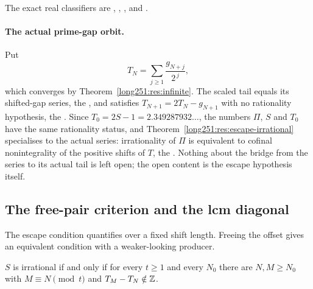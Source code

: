 \documentclass[11pt]{article}
\begin{document}
\noindent The exact real classifiers are
,
,
, and
.

\paragraph{The actual prime-gap orbit.}
Put
\[
 T_N=\sum_{j\ge1}\frac{g_{N+j}}{2^{\,j}},
\]
which converges by Theorem~\ref{long251:res:infinite}.  The scaled tail equals its
shifted-gap series, the
, and satisfies $T_{N+1}=2T_N-g_{N+1}$ with no rationality
hypothesis, the
.  Since $T_0=2S-1=2.349287932\ldots$, the numbers $\Pi$, $S$
and $T_0$ have the same rationality status, and
Theorem~\ref{long251:res:escape-irrational} specialises to the actual series:
irrationality of $\Pi$ is equivalent to cofinal nonintegrality of the positive
shifts of $T$, the
.  Nothing about the bridge from the series to its actual tail is
left open; the open content is the escape hypothesis itself.

\subsection{The free-pair criterion and the lcm diagonal}\label{long251:sec:freepair}

The escape condition quantifies over a fixed shift length.  Freeing the offset
gives an equivalent condition with a weaker-looking producer.

\begin{theorem}\label{long251:res:freepair}
$S$ is irrational if and only if for every $t\ge1$ and every $N_0$ there are
$N,M\ge N_0$ with $M\equiv N\pmod t$ and $T_M-T_N\notin\mathbb{Z}$.
\end{theorem}
\end{document}
